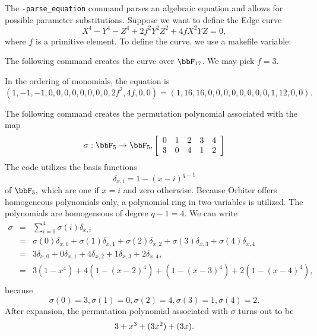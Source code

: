 
\bigskip


The \verb'-parse_equation' command parses 
an algebraic equation and allows for possible parameter substitutions. 
Suppose we want to define the Edge curve 
$$
X^4 -Y^4 -Z^4 +2f^2Y^2Z^2 +4fX^2YZ =0,
$$
where $f$ is a primitive element. 
To define the curve, we use a makefile variable:



The following command creates the curve over $\bbF_{17}$.
We may pick $f=3$. 




In the ordering of monomials, the equation is 
$$
(1,-1,-1,0,0,0,0,0,0,0,0,2f^2,4f,0,0) = (1,16,16,0,0,0,0,0,0,0,0,1,12,0,0).
$$


\bigskip






The following command creates the permutation polynomial associated with the map 
$$
\sigma : \bbF_5 \rightarrow \bbF_5,  
\left[
\begin{array}{ccccc}
0 & 1 & 2 & 3 & 4 \\
3 & 0 & 4 & 1 & 2 \\ 
\end{array}
\right]
$$
The code utilizes the basis functions
$$
\delta_{x,i} = 1-(x-i)^{q-1}
$$ 
of $\bbF_5,$
which are one if $x=i$ and zero otherwise.
Because Orbiter offers homogeneous polynomials only, 
a polynomial ring in two-variables is utilized. 
The polynomials are homogeneous of degree $q-1 = 4.$
We can write 
\begin{eqnarray*}
\sigma &=& \sum_{i=0}^4 \sigma(i)\delta_{x,i} \\
&=& 
\sigma(0)\delta_{x,0} + 
\sigma(1)\delta_{x,1} + 
\sigma(2)\delta_{x,2} + 
\sigma(3)\delta_{x,3} + 
\sigma(4)\delta_{x,4} \\
&=& 
3\delta_{x,0} + 
0\delta_{x,1} + 
4\delta_{x,2} + 
1\delta_{x,3} + 
2\delta_{x,4}, \\
&=& 
3(1-x^4) + 
4(1-(x-2)^4) + 
(1-(x-3)^4) + 
2(1-(x-4)^4), \\
\end{eqnarray*}
because 
$$
\sigma(0) = 3,
\sigma(1) = 0,
\sigma(2) = 4,
\sigma(3) = 1,
\sigma(4) = 2.
$$
After expansion, the permutation polynomial associated with $\sigma$ 
turns out to be 
$$
\begin{array}{*{1}c}
3 + x^{3} + (3 x^{2}) + (3 x).\\
\end{array}
$$


